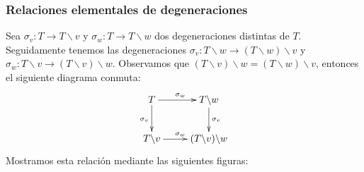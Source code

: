 \documentclass[../main.tex]{subfiles}
\begin{document}
\subsubsection*{Relaciones elementales de degeneraciones}
Sea $\sigma_v \colon T\to T\backslash v$ y $\sigma_w \colon T\to T\backslash w$ dos degeneraciones distintas de $T$.
Seguidamente tenemos las degeneraciones $\sigma_v \colon T\backslash w \to (T\backslash w)\backslash v$ y $\sigma_w \colon T\backslash v \to (T\backslash v)\backslash w$. Observamos que $(T\backslash v)\backslash w = (T\backslash w)\backslash v$, entonces el siguiente diagrama conmuta:
$$
    \xymatrix{
        T \ar[d]_{\sigma_v} \ar[r]^{\sigma_w}
        &T\backslash w \ar[d]^{\sigma_v} \\
        T\backslash v \ar[r]^{\sigma_w}
        &(T\backslash v)\backslash w
    }
$$
Mostramos esta relaci\'on mediante las siguientes figuras:
\end{document}
